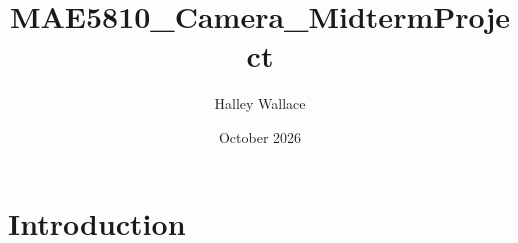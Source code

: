 \documentclass{article}
\title{MAE5810_Camera_MidtermProject}
\author{Halley Wallace}
\date{October 2026}
\begin{document}
\maketitle

\section{Introduction}
\end{document}
